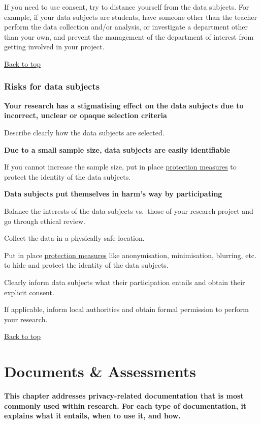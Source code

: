 \documentclass[
]{book}
\begin{document}
If you need to use consent, try to distance yourself from the data subjects. For example, if your data subjects are students, have someone other than the teacher perform the data collection and/or analysis, or investigate a department other than your own, and prevent the management of the department of interest from getting involved in your project.

\protect\hyperlink{example-risks}{Back to top}

\hypertarget{risks-data-subjects}{%
\subsection{Risks for data subjects}\label{risks-data-subjects}}

\textbf{Your research has a stigmatising effect on the data subjects due to incorrect, unclear or opaque selection criteria}

Describe clearly how the data subjects are selected.

\textbf{Due to a small sample size, data subjects are easily identifiable}

If you cannot increase the sample size, put in place \protect\hyperlink{data-oriented-strategies}{protection measures} to protect the identity of the data subjects.

\textbf{Data subjects put themselves in harm's way by participating}

Balance the interests of the data subjects vs.~those of your research project and go through ethical review.

Collect the data in a physically safe location.

Put in place \protect\hyperlink{data-oriented-strategies}{protection measures} like anonymisation, minimisation, blurring, etc. to hide and protect the identity of the data subjects.

Clearly inform data subjects what their participation entails and obtain their explicit consent.

If applicable, inform local authorities and obtain formal permission to perform your research.

\protect\hyperlink{example-risks}{Back to top}

\hypertarget{legal-documents}{%
\chapter{Documents \& Assessments}\label{legal-documents}}

\textbf{This chapter addresses privacy-related documentation that is most commonly used
within research. For each type of documentation, it explains what it entails,
when to use it, and how.}
\end{document}
